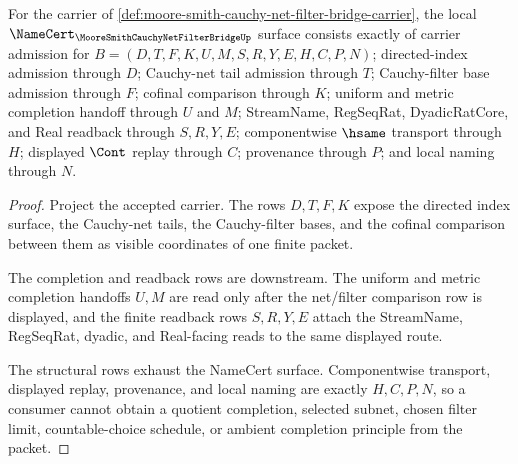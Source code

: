 \begin{theorem}
\label{thm:moore-smith-cauchy-net-filter-bridge-obligations}
For the carrier of \autoref{def:moore-smith-cauchy-net-filter-bridge-carrier}, the local $\NameCert_{\MooreSmithCauchyNetFilterBridgeUp}$ surface consists exactly of carrier admission for $B=(D,T,F,K,U,M,S,R,Y,E,H,C,P,N)$; directed-index admission through $D$; Cauchy-net tail admission through $T$; Cauchy-filter base admission through $F$; cofinal comparison through $K$; uniform and metric completion handoff through $U$ and $M$; StreamName, RegSeqRat, DyadicRatCore, and Real readback through $S,R,Y,E$; componentwise $\hsame$ transport through $H$; displayed $\Cont$ replay through $C$; provenance through $P$; and local naming through $N$.
\end{theorem}
\begin{proof}
Project the accepted carrier. The rows $D,T,F,K$ expose the directed index surface, the Cauchy-net tails, the Cauchy-filter bases, and the cofinal comparison between them as visible coordinates of one finite packet.

The completion and readback rows are downstream. The uniform and metric completion handoffs $U,M$ are read only after the net/filter comparison row is displayed, and the finite readback rows $S,R,Y,E$ attach the StreamName, RegSeqRat, dyadic, and Real-facing reads to the same displayed route.

The structural rows exhaust the NameCert surface. Componentwise transport, displayed replay, provenance, and local naming are exactly $H,C,P,N$, so a consumer cannot obtain a quotient completion, selected subnet, chosen filter limit, countable-choice schedule, or ambient completion principle from the packet.
\end{proof}

